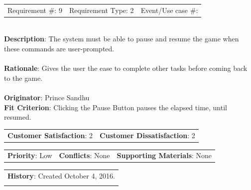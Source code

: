 \documentclass[12pt, titlepage]{article}
\begin{document}
\begin{reqbox}

\begin{tabular}{lll}
Requirement \#: 9 & Requirement Type: 2 & Event/Use case \#: \\
\end{tabular} \\

\textbf{Description}: The system must be able to pause and resume the game when these commands are user-prompted. \\ \\
\textbf{Rationale}: Gives the user the ease to complete other tasks before coming back to the game. \\ \\
\textbf{Originator}: Prince Sandhu \\
\textbf{Fit Criterion}: Clicking the Pause Button pauses the elapsed time, until resumed. \\

\begin{tabular}{ll}
\textbf{Customer Satisfaction}: 2 & \textbf{Customer Dissatisfaction}: 2 \\
\end{tabular}

\begin{tabular}{lll}
\textbf{Priority}: Low & \textbf{Conflicts}: None & \textbf{Supporting Materials}: None \\
\end{tabular}

\begin{tabular}{l}
\textbf{History}: Created October 4, 2016.\\ \\
\end{tabular} \\

\end{reqbox}
\end{document}
